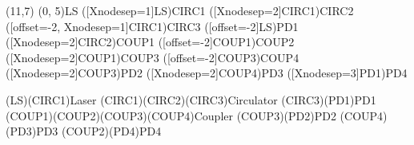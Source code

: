 \documentclass{standalone}
\begin{document}
	\begin{pspicture}(11,7)
        \pnode(0, 5){LS}
        \pnode([Xnodesep=1]LS){CIRC1}
        \pnode([Xnodesep=2]CIRC1){CIRC2}
        \pnode([offset=-2, Xnodesep=1]CIRC1){CIRC3}
        \pnode([offset=-2]LS){PD1}
        \pnode([Xnodesep=2]CIRC2){COUP1}
        \pnode([offset=-2]COUP1){COUP2}
        \pnode([Xnodesep=2]COUP1){COUP3}
        \pnode([offset=-2]COUP3){COUP4}
        \pnode([Xnodesep=2]COUP3){PD2}
        \pnode([Xnodesep=2]COUP4){PD3}
        \pnode([Xnodesep=3]PD1){PD4}
        \begin{optexp}
            \optsource[compname=LS, innerlabel](LS)(CIRC1){Laser}
            \optcirculator[compname=CIRC](CIRC1)(CIRC2)(CIRC3){Circulator}
            \optdetector[compname=PD1](CIRC3)(PD1){PD1}
            \optcoupler(COUP1)(COUP2)(COUP3)(COUP4){Coupler}
            \optdetector[compname=PD2](COUP3)(PD2){PD2}
            \optdetector[compname=PD3](COUP4)(PD3){PD3}
            \optdetector[compname=PD4](COUP2)(PD4){PD4}
        \end{optexp}
    \end{pspicture}
\end{document}
